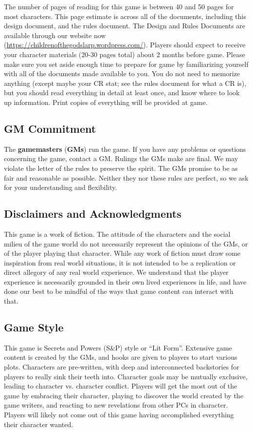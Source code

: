\documentclass[sheet]{PP}
\begin{document}
The number of pages of reading for this game is between 40 and 50 pages for most characters. This page estimate is across all of the documents, including this design document, and the rules document. The Design and Rules Documents are available through our website now (\url{https://childrenofthegodslarp.wordpress.com/}). Players should expect to receive your character materials (20-30 pages total) about 2 months before game. Please make sure you set aside enough time to prepare for game by familiarizing yourself with all of the documents made available to you. You do not need to memorize anything (except maybe your CR stat; see the rules document for what a CR is), but you should read everything in detail at least once, and know where to look up information. Print copies of everything will be provided at game.

\subsection{GM Commitment}
The \textbf{gamemasters} (\textbf{GMs}) run the game. If you have any problems or questions concerning the game, contact a GM. Rulings the GMs make are final.  We may violate the letter of the rules to preserve the spirit.  The GMs promise to be as fair and reasonable as possible. Neither they nor these rules are perfect, so we ask for your understanding and flexibility.

\subsection{Disclaimers and Acknowledgments}
This game is a work of fiction. The attitude of the characters and the social milieu of the game world do not necessarily represent the opinions of the GMs, or of the player playing that character. While any work of fiction must draw some inspiration from real world situations, it is not intended to be a replication or direct allegory of any real world experience. We understand that the player experience is necessarily grounded in their own lived experiences in life, and have done our best to be mindful of the ways that game content can interact with that. 

\subsection{Game Style}
This game is Secrets and Powers (S\&P) style or ``Lit Form''. Extensive game content is created by the GMs, and hooks are given to players to start various plots. Characters are pre-written, with deep and interconnected backstories for players to really sink their teeth into. Character goals may be mutually exclusive, leading to character vs. character conflict. Players will get the most out of the game by embracing their character, playing to discover the world created by the game writers, and reacting to new revelations from other PCs in character. Players will likely not come out of this game having accomplished everything their character wanted.
\end{document}
